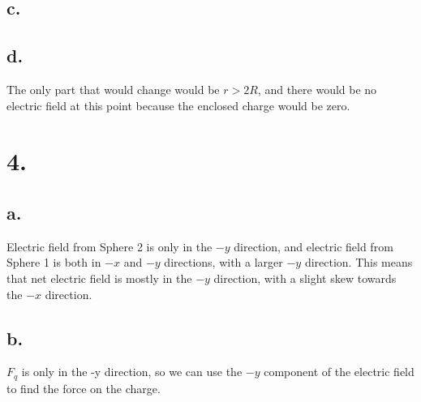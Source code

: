 \documentclass{article}
\begin{document}
\subsection*{c.}

\begin{center}
\end{center}

\subsection*{d.}
The only part that would change would be $r>2R$, and there would be no electric field at this point because the enclosed charge would be zero.

\section*{4.}

\subsection*{a.} 

Electric field from Sphere 2 is only in the $-y$ direction, and electric field from Sphere 1 is both in $-x$ and $-y$ directions, with a larger $-y$ 
direction. This means that net electric field is mostly in the $-y$ direction, with a slight skew towards the $-x$ direction.

\subsection*{b.}

$F_q$ is only in the -y direction, so we can use the $-y$ component of the electric field to find the force on the charge.
\end{document}
